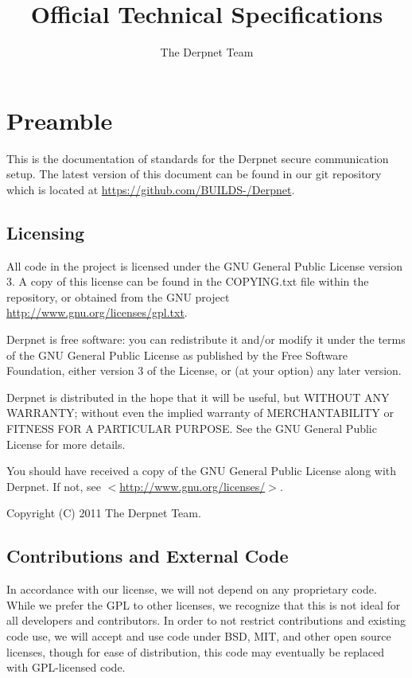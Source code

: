 \documentclass[11pt]{article}
\title{Official Technical Specifications}
\author{The Derpnet Team}
\begin{document}
\maketitle

\section{Preamble}

This is the documentation of standards for the Derpnet secure communication
setup.  The latest version of this document can be found in our git repository
which is located at
\href{https://github.com/BUILDS-/Derpnet}{https://github.com/BUILDS-/Derpnet}.

\subsection{Licensing}

All code in the project is licensed under the GNU General Public License
version 3.  A copy of this license can be found in the COPYING.txt file within
the repository, or obtained from the GNU project
\href{http://www.gnu.org/licenses/gpl.txt}{http://www.gnu.org/licenses/gpl.txt}.


Derpnet is free software: you can redistribute it and/or modify it under the
terms of the GNU General Public License as published by the Free Software
Foundation, either version 3 of the License, or (at your option) any later
version.

Derpnet is distributed in the hope that it will be useful, but WITHOUT ANY
WARRANTY; without even the implied warranty of MERCHANTABILITY or FITNESS FOR
A PARTICULAR PURPOSE.  See the GNU General Public License for more details.

You should have received a copy of the GNU General Public License along with
Derpnet.  If not, see $<$\href{http://www.gnu.org/licenses/}{http://www.gnu.org/licenses/}$>$.
 
Copyright (C) 2011 The Derpnet Team.

\subsection{Contributions and External Code}

In accordance with our license, we will not depend on any proprietary code.
While we prefer the GPL to other licenses, we recognize that this is not ideal
for all developers and contributors.  In order to not restrict contributions
and existing code use, we will accept and use code under BSD, MIT, and other
open source licenses, though for ease of distribution, this code may
eventually be replaced with GPL-licensed code.
\end{document}
